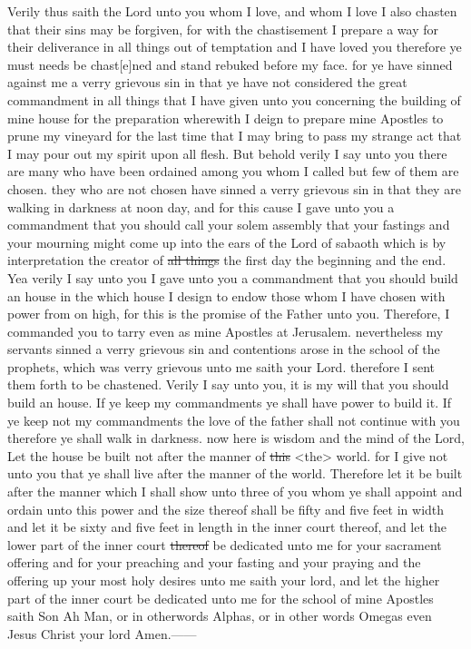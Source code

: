				Verily thus saith the Lord unto you whom I love, and whom I love I also chasten that their sins may be forgiven, for with the chastisement I prepare a way for their deliverance in all things out of temptation and I have loved you therefore ye must needs be chast[e]ned and stand rebuked before my face. for ye have sinned against me a verry grievous sin in that ye have not considered the great commandment in all things that I have given unto you concerning the building of mine house for the preparation wherewith I deign to prepare mine Apostles to prune my vineyard for the last time that I may bring to pass my strange act that I may pour out my spirit upon all flesh. But behold verily I say unto you there are many who have been ordained among you whom I called but few of them are chosen. they who are not chosen have sinned a verry grievous sin in that they are walking in darkness at noon day, and for this cause I gave unto you a commandment that you should call your solem assembly that your fastings and your mourning might come up into the ears of the Lord of sabaoth which is by interpretation the creator of \sout{all things} the first day the beginning and the end. Yea verily I say unto you I gave unto you a commandment that you should build an house in the which house I design to endow those whom I have chosen with power from on high, for this is the promise of the Father unto you. Therefore, I commanded you to tarry even as mine Apostles at Jerusalem. nevertheless my servants sinned a verry grievous sin and contentions arose in the school of the prophets, which was verry grievous unto me saith your Lord. therefore I sent them forth to be chastened. Verily I say unto you, it is my will that you should build an house. If ye keep my commandments ye shall have power to build it. If ye keep not my commandments the love of the father shall not continue with you therefore ye shall walk in darkness. now here is wisdom and the mind of the Lord, Let the house be built not after the manner of \sout{this} <the> world. for I give not unto you that ye shall live after the manner of the world. Therefore let it be built after the manner which I shall show unto three of you whom ye shall appoint and ordain unto this power and the size thereof shall be fifty and five feet in width and let it be sixty and five feet in length in the inner court thereof, and let the lower part of the inner court \sout{thereof} be dedicated unto me for your sacrament offering and for your preaching and your fasting and your praying and the offering up your most holy desires unto me saith your lord, and let the higher part of the inner court be dedicated unto me for the school of mine Apostles saith Son Ah Man, or in otherwords Alphas, or in other words Omegas even Jesus Christ your lord Amen.------
				
